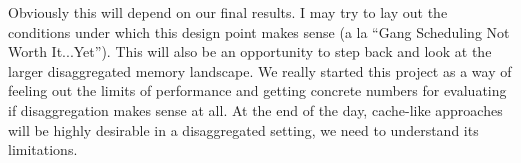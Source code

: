 Obviously this will depend on our final results. I may try to lay out the conditions under which this design point makes sense (a la ``Gang Scheduling Not Worth It...Yet''). This will also be an opportunity to step back and look at the larger disaggregated memory landscape. We really started this project as a way of feeling out the limits of performance and getting concrete numbers for evaluating if disaggregation makes sense at all. At the end of the day, cache-like approaches will be highly desirable in a disaggregated setting, we need to understand its limitations.